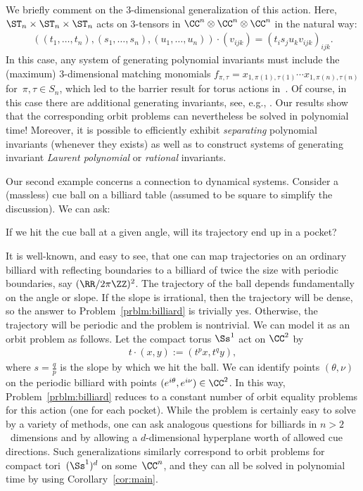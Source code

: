 %
%
%
%
%
%
%
%
%
%
%
%
%
%
%

We briefly comment on the 3-dimensional generalization of this action.
Here, $\ST_n \times \ST_n \times \ST_n$ acts on 3-tensors in $\CC^n \otimes \CC^n \otimes \CC^n$ in the natural way:
\begin{align*}
  ((t_1,\dots,t_n),(s_1,\dots,s_n),(u_1,\dots,u_n)) \cdot (v_{ijk}) = (t_i s_j u_k v_{ijk})_{ijk}.
\end{align*}
In this case, any system of generating polynomial invariants must include the (maximum) 3-dimensional matching monomials $f_{\pi,\tau} = x_{1,\pi(1),\tau(1)} \cdots x_{1,\pi(n),\tau(n)}$ for~$\pi,\tau\in S_n$, which led to the barrier result for torus actions in~\cite{GIMOWW}.
Of course, in this case there are additional generating invariants, see, e.g., \cite{linial2014vertices}.
Our results show that the corresponding orbit problems can nevertheless be solved in polynomial time!
Moreover, it is possible to efficiently exhibit \emph{separating} polynomial invariants (whenever they exists) as well as to construct systems of generating invariant \emph{Laurent polynomial} or \emph{rational} invariants.

Our second example concerns a connection to dynamical systems.
Consider a (massless) cue ball on a billiard table (assumed to be square to simplify the discussion).
We can ask:

\begin{problem}\label{prblm:billiard}
If we hit the cue ball at a given angle, will its trajectory end up in a pocket?
\end{problem}

It is well-known, and easy to see, that one can map trajectories on an ordinary billiard with reflecting boundaries to a billiard of twice the size with periodic boundaries, say $(\RR/2\pi\ZZ)^2$.
The trajectory of the ball depends fundamentally on the angle or slope. 
If the slope is irrational, then the trajectory will be dense, so the answer to Problem~\ref{prblm:billiard} is trivially yes.
Otherwise, the trajectory will be periodic and the problem is nontrivial.
We can model it as an orbit problem as follows.
Let the compact torus $\Ss^1$ act on $\CC^2$ by
\begin{align*}
  t \cdot (x,y) := (t^p x, t^q y),
\end{align*}
where $s=\frac qp$ is the slope by which we hit the ball.
We can identify points $(\theta,\nu)$ on the periodic billiard with points $(e^{i\theta},e^{i\nu}) \in \CC^2$.
In this way, Problem~\ref{prblm:billiard} reduces to a constant number of orbit equality problems for this action (one for each pocket).
While the problem is certainly easy to solve by a variety of methods, one can ask analogous questions for billiards in $n>2$~dimensions and by allowing a $d$-dimensional hyperplane worth of allowed cue directions.
Such generalizations similarly correspond to orbit problems for compact tori~$(\Ss^1)^d$ on some~$\CC^n$, and they can all be solved in polynomial time by using Corollary~\ref{cor:main}.

